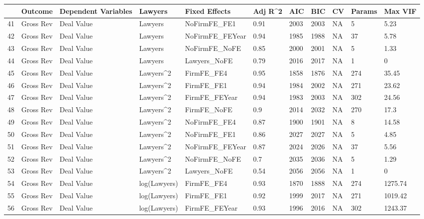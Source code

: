 \begin{table}[ht]
\centering
\begin{tabular}{rllllllllll}
  \hline
 & Outcome & Dependent Variables & Lawyers & Fixed Effects & Adj R^2 & AIC & BIC & CV & Params & Max VIF \\ 
  \hline
41 & Gross Rev & Deal Value & Lawyers & NoFirmFE\_FE1 & 0.91 & 2003 & 2003 & NA & 5 & 5.23 \\ 
  42 & Gross Rev & Deal Value & Lawyers & NoFirmFE\_FEYear & 0.94 & 1985 & 1988 & NA & 37 & 5.78 \\ 
  43 & Gross Rev & Deal Value & Lawyers & NoFirmFE\_NoFE & 0.85 & 2000 & 2001 & NA & 5 & 1.33 \\ 
  44 & Gross Rev & Deal Value & Lawyers & Lawyers\_NoFE & 0.79 & 2016 & 2017 & NA & 1 & 0 \\ 
  45 & Gross Rev & Deal Value & Lawyers^2 & FirmFE\_FE4 & 0.95 & 1858 & 1876 & NA & 274 & 35.45 \\ 
  46 & Gross Rev & Deal Value & Lawyers^2 & FirmFE\_FE1 & 0.94 & 1984 & 2002 & NA & 271 & 23.62 \\ 
  47 & Gross Rev & Deal Value & Lawyers^2 & FirmFE\_FEYear & 0.94 & 1983 & 2003 & NA & 302 & 24.56 \\ 
  48 & Gross Rev & Deal Value & Lawyers^2 & FirmFE\_NoFE & 0.9 & 2014 & 2032 & NA & 270 & 17.3 \\ 
  49 & Gross Rev & Deal Value & Lawyers^2 & NoFirmFE\_FE4 & 0.87 & 1900 & 1901 & NA & 8 & 14.58 \\ 
  50 & Gross Rev & Deal Value & Lawyers^2 & NoFirmFE\_FE1 & 0.86 & 2027 & 2027 & NA & 5 & 4.85 \\ 
  51 & Gross Rev & Deal Value & Lawyers^2 & NoFirmFE\_FEYear & 0.87 & 2024 & 2026 & NA & 37 & 5.56 \\ 
  52 & Gross Rev & Deal Value & Lawyers^2 & NoFirmFE\_NoFE & 0.7 & 2035 & 2036 & NA & 5 & 1.29 \\ 
  53 & Gross Rev & Deal Value & Lawyers^2 & Lawyers\_NoFE & 0.54 & 2056 & 2056 & NA & 1 & 0 \\ 
  54 & Gross Rev & Deal Value & log(Lawyers) & FirmFE\_FE4 & 0.93 & 1870 & 1888 & NA & 274 & 1275.74 \\ 
  55 & Gross Rev & Deal Value & log(Lawyers) & FirmFE\_FE1 & 0.92 & 1999 & 2017 & NA & 271 & 1019.42 \\ 
  56 & Gross Rev & Deal Value & log(Lawyers) & FirmFE\_FEYear & 0.93 & 1996 & 2016 & NA & 302 & 1243.37 \\ 

\end{tabular}
\end{table}
